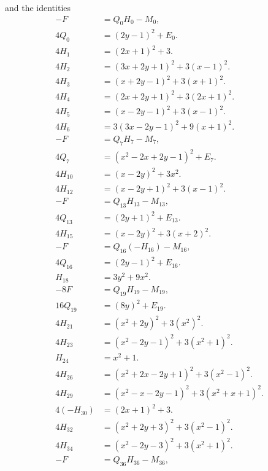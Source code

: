 \documentclass[11pt]{article}
\begin{document}
and the identities
\begin{align}
-F&=Q_{0}H_{0}-M_{0},\label{eq:sign0}\\
4Q_{0}&=(2y-1)^2+E_{0}.\label{eq:sign0b}\\
4H_{1}&=(2x+1)^2+3.\label{eq:sign1}\\
4H_{2}&=(3x+2y+1)^2+3(x-1)^2.\label{eq:sign2}\\
4H_{3}&=(x+2y-1)^2+3(x+1)^2.\label{eq:sign3}\\
4H_{4}&=(2x+2y+1)^2+3(2x+1)^2.\label{eq:sign4}\\
4H_{5}&=(x-2y-1)^2+3(x-1)^2.\label{eq:sign5}\\
4H_{6}&=3(3x-2y-1)^2+9(x+1)^2.\label{eq:sign6}\\
-F&=Q_{7}H_{7}-M_{7},\label{eq:sign7}\\
4Q_{7}&=(x^{2}-2x+2y-1)^2+E_{7}.\label{eq:sign7b}\\
4H_{10}&=(x-2y)^2+3x^2.\label{eq:sign10}\\
4H_{12}&=(x-2y+1)^2+3(x-1)^2.\label{eq:sign12}\\
-F&=Q_{13}H_{13}-M_{13},\label{eq:sign13}\\
4Q_{13}&=(2y+1)^2+E_{13}.\label{eq:sign13b}\\
4H_{15}&=(x-2y)^2+3(x+2)^2.\label{eq:sign15}\\
-F&=Q_{16}(-H_{16})-M_{16},\label{eq:sign16}\\
4Q_{16}&=(2y-1)^2+E_{16}.\label{eq:sign16b}\\
H_{18}&=3y^2+9x^2.\label{eq:sign18}\\
-8F&=Q_{19}H_{19}-M_{19},\label{eq:sign19}\\
16Q_{19}&=(8y)^2+E_{19}.\label{eq:sign19b}\\
4H_{21}&=(x^{2}+2y)^2+3(x^{2})^2.\label{eq:sign21}\\
4H_{23}&=(x^{2}-2y-1)^2+3(x^{2}+1)^2.\label{eq:sign23}\\
H_{24}&=x^2+1.\label{eq:sign24}\\
4H_{26}&=(x^{2}+2x-2y+1)^2+3(x^{2}-1)^2.\label{eq:sign26}\\
4H_{29}&=(x^{2}-x-2y-1)^2+3(x^{2}+x+1)^2.\label{eq:sign29}\\
4(-H_{30})&=(2x+1)^2+3.\label{eq:sign30}\\
4H_{32}&=(x^{2}+2y+3)^2+3(x^{2}-1)^2.\label{eq:sign32}\\
4H_{34}&=(x^{2}-2y-3)^2+3(x^{2}+1)^2.\label{eq:sign34}\\
-F&=Q_{36}H_{36}-M_{36},\label{eq:sign36}\\

\end{align}
\end{document}
